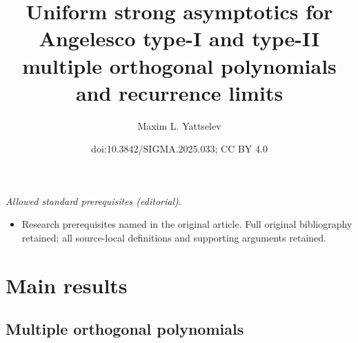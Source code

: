\documentclass[10pt,a4paper]{amsart}
\title{Uniform strong asymptotics for Angelesco type-I and type-II multiple orthogonal polynomials and recurrence limits}
\author{Maxim L. Yattselev}
\date{doi:10.3842/SIGMA.2025.033; CC BY 4.0}
\numberwithin{equation}{section}
\begin{document}
\maketitle
\noindent\textit{Allowed standard prerequisites (editorial).}\begin{itemize}
\item Research prerequisites named in the original article. Full original bibliography retained; all source-local definitions and supporting arguments retained.
\end{itemize}\medskip
\section{Main results}

\subsection{Multiple orthogonal polynomials}
\end{document}
